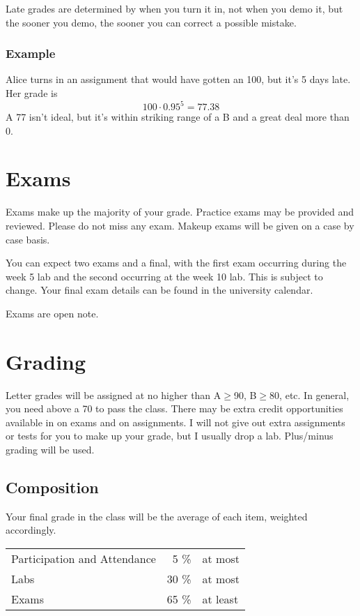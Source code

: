 \documentclass[10pt, letter]{article}
\begin{document}
Late grades are determined by when you turn it in, not when you demo it, but the sooner you demo, the sooner you can correct a possible mistake. 

\subsubsection*{Example}
Alice turns in an assignment that would have gotten an 100, but it's 5 days late.  Her grade is $$100\cdot 0.95^{5} = 77.38$$ A 77 isn't ideal, but it's within striking range of a B and a great deal more than 0.

\section{Exams}
Exams make up the majority of your grade.
Practice exams may be provided and reviewed.  
Please do not miss any exam.  
Makeup exams will be given on a case by case basis.


You can expect two exams and a final, with the first exam occurring during the week 5 lab and the second occurring at the week 10 lab.
This is subject to change.
Your final exam details can be found in the university calendar.

Exams are open note.

\section{Grading}

Letter grades will be assigned at no higher than A$\geq$90, B$\geq$80, etc.
In general, you need above a 70 to pass the class.
There may be extra credit opportunities available in on exams and on assignments.
I will not give out extra assignments or tests for you to make up your grade, but I usually drop a lab.
Plus/minus grading will be used.
\subsection*{Composition}
Your final grade in the class will be the average of each item, weighted accordingly.

\begin{tabular}{ l  r l}
	Participation and Attendance & 5 \% & at most \\
	Labs & 30 \% & at most \\
	Exams & 65 \% & at least \\
\end{tabular}
\end{document}
